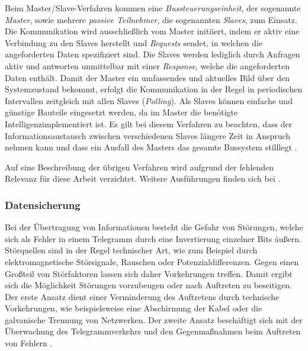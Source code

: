 Beim Master/Slave-Verfahren kommen eine \textit{Bussteuerungseinheit}, der sogenannte \textit{Master}, sowie mehrere \textit{passive Teilnehmer}, die sogenannten \textit{Slaves}, zum Einsatz.
Die Kommunikation wird ausschließlich vom Master initiiert, indem er aktiv eine Verbindung zu den Slaves herstellt und \textit{Requests} sendet, in welchen die angeforderten Daten spezifiziert sind.
Die Slaves werden lediglich durch Anfragen aktiv und antworten unmittelbar mit einer \textit{Response}, welche die angeforderten Daten enthält.
Damit der Master ein umfassendes und aktuelles Bild über den Systemzustand bekommt, erfolgt die Kommunikation in der Regel in periodischen Intervallen zeitgleich mit allen Slaves (\textit{Polling}). Als Slaves können einfache und günstige Bauteile eingesetzt werden, da im Master die benötigte \Gun Intelligenz\Gob implementiert ist. 
Es gilt bei diesem Verfahren zu beachten, dass der Informationsaustausch zwischen verschiedenen Slaves längere Zeit in Anspruch nehmen kann und dass ein Ausfall des Masters das gesamte Bussystem stilllegt \cite[S.~19ff.]{schn06}.

Auf eine Beschreibung der übrigen Verfahren wird aufgrund der fehlenden Relevanz für diese Arbeit verzichtet. Weitere Ausführungen finden sich bei \cite{schn06}.

\subsubsection{Datensicherung}

Bei der Übertragung von Informationen besteht die Gefahr von Störungen, welche sich als Fehler in einem Telegramm durch eine Invertierung einzelner Bits äußern. Störquellen sind in der Regel technischer Art, wie zum Beispiel durch elektromagnetische Störsignale, Rauschen oder Potenzialdifferenzen. Gegen einen Großteil von Störfaktoren lassen sich daher Vorkehrungen treffen. Damit ergibt sich die Möglichkeit Störungen vorzubeugen oder nach Auftreten zu beseitigen. Der erste Ansatz dient einer Verminderung des Auftretens durch technische Vorkehrungen, wie beispielsweise eine Abschirmung der Kabel oder die galvanische Trennung von Netzwerken. Der zweite Ansatz beschäftigt sich mit der Überwachung des Telegrammverkehrs und den Gegenmaßnahmen beim Auftreten von Fehlern \cite[S.~30]{schn06}.

